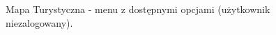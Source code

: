 \begin{figure}[H]
    \centering
    \caption{Mapa Turystyczna - menu z dostępnymi opcjami (użytkownik niezalogowany).}
    \label{mapatu:menu}
\end{figure}
